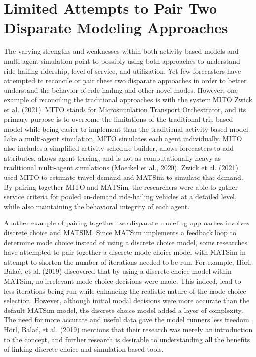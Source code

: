 \documentclass[fancy, masters]{byuthesis}
\begin{document}
\hypertarget{limited-attempts-to-pair-two-disparate-modeling-approaches}{%
\section{Limited Attempts to Pair Two Disparate Modeling Approaches}\label{limited-attempts-to-pair-two-disparate-modeling-approaches}}

The varying strengths and weaknesses within both activity-based models and multi-agent simulation point to possibly using both approaches to understand ride-hailing ridership, level of service, and utilization. Yet few forecasters have attempted to reconcile or pair these two disparate approaches in order to better understand the behavior of ride-hailing and other novel modes. However, one example of reconciling the traditional approaches is with the system MITO Zwick et al. (2021). MITO stands for Microsimulation Transport Orchestrator, and its primary purpose is to overcome the limitations of the traditional trip-based model while being easier to implement than the traditional activity-based model. Like a multi-agent simulation, MITO simulates each agent individually. MITO also includes a simplified activity schedule builder, allows forecasters to add attributes, allows agent tracing, and is not as computationally heavy as traditional multi-agent simulations (Moeckel et al., 2020). Zwick et al. (2021) used MITO to estimate travel demand and MATSim to simulate that demand. By pairing together MITO and MATSim, the researchers were able to gather service criteria for pooled on-demand ride-hailing vehicles at a detailed level, while also maintaining the behavioral integrity of each agent.

Another example of pairing together two disparate modeling approaches involves discrete choice and MATSIM. Since MATSim implements a feedback loop to determine mode choice instead of using a discrete choice model, some researches have attempted to pair together a discrete mode choice model with MATSim in attempt to shorten the number of iterations needed to be run. For example, Hörl, Balać, et al. (2019) discovered that by using a discrete choice model within MATSim, no irrelevant mode choice decisions were made. This indeed, lead to less iterations being run while enhancing the realistic nature of the mode choice selection. However, although initial modal decisions were more accurate than the default MATSim model, the discrete choice model added a layer of complexity. The need for more accurate and useful data gave the model runners less freedom. Hörl, Balać, et al. (2019) mentions that their research was merely an introduction to the concept, and further research is desirable to understanding all the benefits of linking discrete choice and simulation based tools.
\end{document}
